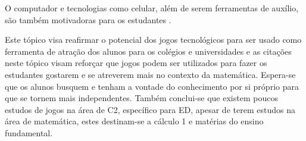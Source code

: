 O computador e tecnologias como celular, além de serem ferramentas de auxílio, são também  motivadoras para os estudantes \cite{softwaregamificado}.

Este tópico visa reafirmar o potencial dos jogos tecnológicos para ser usado como ferramenta de atração dos alunos para os colégios e universidades e as citações neste tópico visam reforçar que jogos podem ser utilizados para fazer os estudantes gostarem e se atreverem mais no contexto da matemática. Espera-se que os alunos busquem e tenham a vontade do conhecimento por si próprio para que se tornem mais independentes. Também conclui-se que existem poucos estudos de jogos na área de C2, específico para ED, apesar de terem estudos na área de matemática, estes destinam-se a cálculo 1 e matérias do ensino fundamental.


\begin{comment}
Gamificação foca em elementos como desafios, níveis, avatar, conquistas, histórias, pontos (Gustavo Fortes Tondello, PhD). Esses elementos são utilizados para engajamento do jogador.

Completar missões e derrotar um chefão faz o jogador se sentir competente (Gustavo Fortes Tondello, PhD).
Ser capaz de escolher diferentes caminhos ou criar coisas diferentes faz o jogador se sentir autônomo (Gustavo Fortes Tondello, PhD).
\end{comment}
